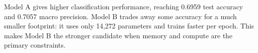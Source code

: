 Model A gives higher classification performance, reaching 0.6959 test accuracy and 0.7057 macro precision. Model B trades away some accuracy for a much smaller footprint: it uses only 14,272 parameters and trains faster per epoch. This makes Model B the stronger candidate when memory and compute are the primary constraints.

